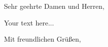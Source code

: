 \opening{Sehr geehrte Damen und Herren,}
    
Your text here...

\closing{Mit freundlichen Grüßen,}

